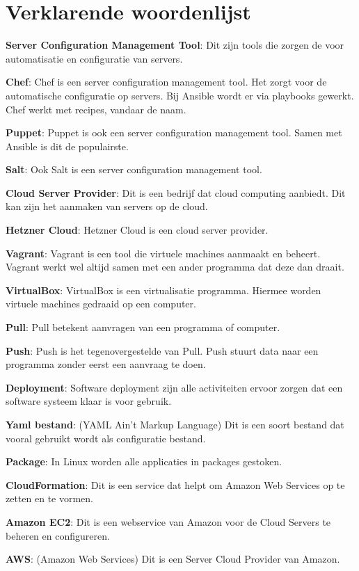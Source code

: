 \chapter{Verklarende woordenlijst}
\textbf{Server Configuration Management Tool}: Dit zijn tools die zorgen de voor automatisatie en configuratie van servers.

\textbf{Chef}: Chef is een server configuration management tool. Het zorgt voor de automatische configuratie op servers. Bij Ansible wordt er via playbooks gewerkt. Chef werkt met recipes, vandaar de naam.

\textbf{Puppet}: Puppet is ook een server configuration management tool. Samen met Ansible is dit de populairste.   

\textbf{Salt}: Ook Salt is een server configuration management tool.  

\textbf{Cloud Server Provider}: Dit is een bedrijf dat cloud computing aanbiedt. Dit kan zijn het aanmaken van servers op de cloud.

\textbf{Hetzner Cloud}: Hetzner Cloud is een cloud server provider.

\textbf{Vagrant}: Vagrant is een tool die virtuele machines aanmaakt en beheert. Vagrant werkt wel altijd samen met een ander programma dat deze dan draait.

\textbf{VirtualBox}: VirtualBox is een virtualisatie programma. Hiermee worden  virtuele machines gedraaid op een computer.

\textbf{Pull}: Pull betekent aanvragen van een programma of computer.

\textbf{Push}: Push is het tegenovergestelde van Pull. Push stuurt data naar een programma zonder eerst een aanvraag te doen.

\textbf{Deployment}: Software deployment zijn alle activiteiten ervoor zorgen dat een software systeem klaar is voor gebruik.

\textbf{Yaml bestand}: (YAML Ain't Markup Language) Dit is een soort bestand dat vooral gebruikt wordt als configuratie bestand.

\textbf{Package}: In Linux worden alle applicaties in packages gestoken.

\textbf{CloudFormation}: Dit is een service dat helpt om Amazon Web Services op te zetten en te vormen.

\textbf{Amazon EC2}: Dit is een webservice van Amazon voor de Cloud Servers te beheren en configureren.

\textbf{AWS}: (Amazon Web Services) Dit is een Server Cloud Provider van Amazon.

